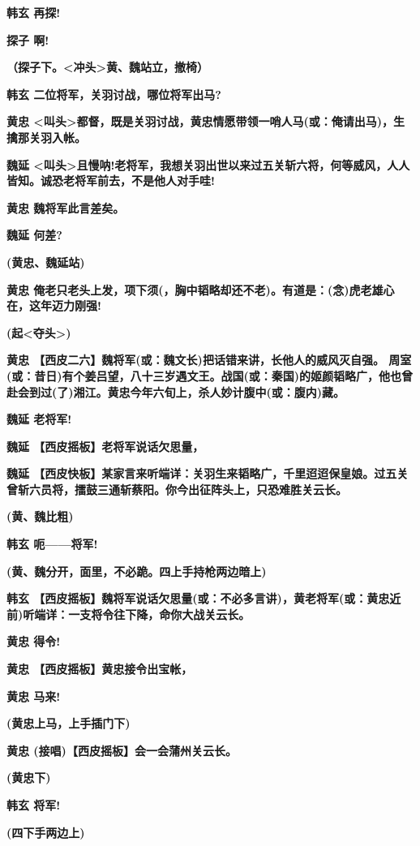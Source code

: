 \textbf{韩玄 再探!}

\textbf{探子 啊!}

\textbf{（探子下。\textless{}冲头\textgreater{}黄、魏站立，撤椅）}

\textbf{韩玄 二位将军，关羽讨战，哪位将军出马?}

\textbf{黄忠
\textless{}叫头\textgreater{}都督，既是关羽讨战，黄忠情愿带领一哨人马(或：俺请出马)，生擒那关羽入帐。}

\textbf{魏延
\textless{}叫头\textgreater{}且慢呐!老将军，我想关羽出世以来过五关斩六将，何等威风，人人皆知。诚恐老将军前去，不是他人对手哇!}

\textbf{黄忠 魏将军此言差矣。}

\textbf{魏延 何差?}

\textbf{(黄忠、魏延站)}

\textbf{黄忠
俺老只老头上发，项下须(，胸中韬略却还不老)。有道是：(念)虎老雄心在，这年迈力刚强!}

\textbf{(起\textless{}夺头\textgreater{})}

\textbf{黄忠
【西皮二六】魏将军(或：魏文长)把话错来讲，长他人的威风灭自强。
周室(或：昔日)有个姜吕望，八十三岁遇文王。战国(或：秦国)的姬颜韬略广，他也曾赴会到过(了)湘江。黄忠今年六旬上，杀人妙计腹中(或：腹内)藏。}

\textbf{魏延 老将军!}

\textbf{魏延 【西皮摇板】老将军说话欠思量，}

\textbf{魏延
【西皮快板】某家言来听端详：关羽生来韬略广，千里迢迢保皇娘。过五关曾斩六员将，擂鼓三通斩蔡阳。你今出征阵头上，只恐难胜关云长。}

\textbf{(黄、魏比粗)}

\textbf{韩玄 呃------将军!}

\textbf{(黄、魏分开，面里，不必跪。四上手持枪两边暗上)}

\textbf{韩玄
【西皮摇板】魏将军说话欠思量(或：不必多言讲)，黄老将军(或：黄忠近前)听端详：一支将令往下降，命你大战关云长。}

\textbf{黄忠 得令!}

\textbf{黄忠 【西皮摇板】黄忠接令出宝帐，}

\textbf{黄忠 马来!}

\textbf{(黄忠上马，上手插门下)}

\textbf{黄忠 (接唱)【西皮摇板】会一会蒲州关云长。}

\textbf{(黄忠下)}

\textbf{韩玄 将军!}

\textbf{(四下手两边上)}


